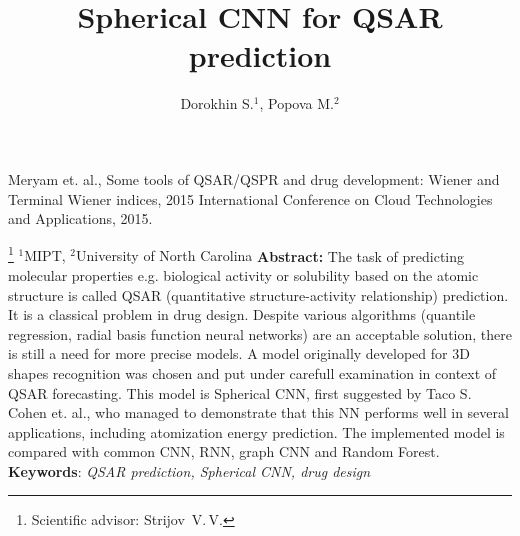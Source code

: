 \documentclass[12pt,twoside]{article}
\begin{document}
\begin{thebibliography}{9}


    Meryam et. al., 
    Some tools of QSAR/QSPR and drug development: Wiener and Terminal Wiener indices, 
    2015 International Conference on Cloud Technologies and Applications,
    2015.
\end{thebibliography}
\title
{Spherical CNN for QSAR prediction}
\author
{Dorokhin S.$^1$, Popova M.$^2$} %
\thanks
{Scientific advisor:  Strijov~V.\,V.
}
\organization
{$^1$MIPT, $^2$University of North Carolina}
\abstract
{
    \textbf{Abstract:}
    The task of predicting molecular properties e.g. biological activity or solubility based on the atomic structure is called QSAR (quantitative structure-activity relationship) prediction.
    It is a classical problem in drug design.
    Despite various algorithms (quantile regression, radial basis function neural networks) are an acceptable solution, there is still a need for more precise models. 
    A model originally developed for 3D shapes recognition was chosen and put under carefull examination in context of QSAR forecasting.
    This model is Spherical CNN, first suggested by Taco S. Cohen et. al., who managed to demonstrate that this NN performs well in several applications, including atomization energy prediction.
    The implemented model is compared with common CNN, RNN, graph CNN and Random Forest.    
\bigskip
\newline
\textbf{Keywords}: \emph {QSAR prediction, Spherical CNN, drug design}
}
\maketitle
\end{document}
